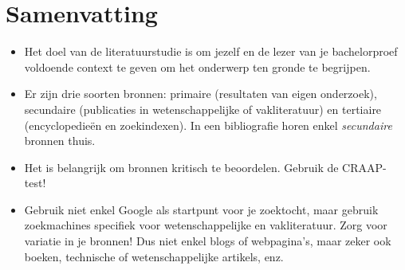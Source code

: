 \section{Samenvatting}%
\label{sec:literatuuronderzoek_samenvatting}

\begin{itemize}
  \item Het doel van de literatuurstudie is om jezelf en de lezer van je bachelorproef voldoende context te geven om het onderwerp ten gronde te begrijpen.
  \item Er zijn drie soorten bronnen: primaire (resultaten van eigen onderzoek), secundaire (publicaties in wetenschappelijke of vakliteratuur) en tertiaire (encyclopedieën en zoekindexen). In een bibliografie horen enkel \emph{secundaire} bronnen thuis.
  \item Het is belangrijk om bronnen kritisch te beoordelen. Gebruik de CRAAP-test!
  \item Gebruik niet enkel Google als startpunt voor je zoektocht, maar gebruik zoekmachines specifiek voor wetenschappelijke en vakliteratuur. Zorg voor variatie in je bronnen! Dus niet enkel blogs of webpagina's, maar zeker ook boeken, technische of wetenschappelijke artikels, enz.
\end{itemize}
